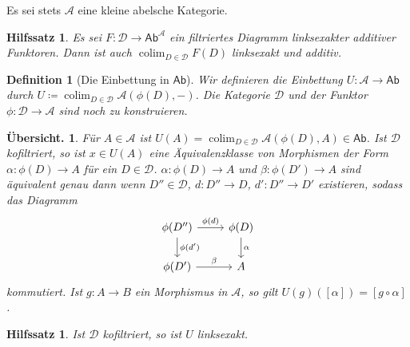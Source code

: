 \documentclass[a4paper, parskip=half,11pt]{scrartcl}
\theoremstyle{marginbreak}
\newtheorem{lemma}[remark]{Hilfssatz}
\newtheorem{definition}[remark]{Definition}
\theoremstyle{nonumberplain}
\newtheorem{proof}{Beweis.}
\newtheorem{overview}{Übersicht.}
\newcommand\ccat\mathsf
\newcommand\cat\mathcal
\newcommand{\p}[1]{\iftoggle{proofs}{#1}{}}
\newcommand{\n}{\pgfmatrixnextcell}
\DeclareMathOperator{\colim}{colim}
\begin{document}
		\setcounter{section}{1}
		Es sei stets $\cat{A}$ eine kleine abelsche Kategorie.
		\begin{lemma}\label{1-14-1}
			Es sei $F\colon\cat{D}\to\ccat{Ab}^{\cat{A}}$ ein filtriertes Diagramm
			linksexakter additiver Funktoren. Dann ist auch $\colim_{D\in\cat{D}} F(D)$
			linksexakt und additiv.
		\end{lemma}
		\p{\begin{proof}
			Ohne.
		\end{proof}}
		\begin{definition}[Die Einbettung in $\ccat{Ab}$]
			Wir definieren die Einbettung $U\colon\cat{A}\to\ccat{Ab}$ durch
			$U\coloneqq \colim_{D\in\cat{D}}\cat{A}(\phi(D), {-})$.
			Die Kategorie $\cat{D}$ und der Funktor $\phi\colon\cat{D}\to\cat{A}$ sind
			noch zu konstruieren.
		\end{definition}
		\begin{overview}
			Für $A\in\cat{A}$ ist $U(A)=\colim_{D\in\cat{D}}\cat{A}(\phi(D), A)\in\ccat{Ab}$.
			Ist $\cat{D}$ kofiltriert, so ist $x\in U(A)$ eine Äquivalenzklasse
			von Morphismen der Form $\alpha\colon \phi(D)\to A$ für ein $D\in\cat{D}$.
			$\alpha\colon\phi(D)\to A$ und $\beta\colon\phi(D')\to A$ sind äquivalent
			genau dann wenn $D''\in\cat{D}$, $d\colon D''\to D$, $d'\colon D''\to D'$
			existieren, sodass das Diagramm
			\[
				\begin{tikzcd}
					\phi(D'')
						\ar{r}{\phi(d)}
						\ar{d}{\phi(d')} \n
					\phi(D)
						\ar{d}{\alpha} \\
					\phi(D')
						\ar{r}{\beta} \n
					A
				\end{tikzcd}
			\]
			kommutiert. Ist $g\colon A\to B$ ein Morphismus in $\cat{A}$, so gilt
			$U(g)([\alpha]) = [g\circ\alpha]$.
		\end{overview}
		\begin{lemma}
			Ist $\cat{D}$ kofiltriert, so ist $U$ linksexakt.
		\end{lemma}
\end{document}
